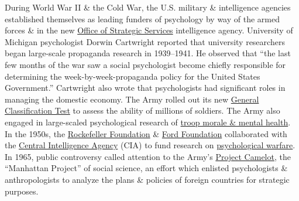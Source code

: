 \documentclass[oneside]{book}
\numberwithin{equation}{section}
\begin{document}
During World War II \& the Cold War, the U.S. military \& intelligence agencies established themselves as leading funders of psychology by way of the armed forces \& in the new \href{https://en.wikipedia.org/wiki/Office_of_Strategic_Services}{Office of Strategic Services} intelligence agency. University of Michigan psychologist Dorwin Cartwright reported that university researchers began large-scale propaganda research in 1939--1941. He observed that ``the last few months of the war saw a social psychologist become chiefly responsible for determining the week-by-week-propaganda policy for the United States Government.'' Cartwright also wrote that psychologists had significant roles in managing the domestic economy. The Army rolled out its new \href{https://en.wikipedia.org/wiki/Army_General_Classification_Test}{General Classification Test} to assess the ability of millions of soldiers. The Army also engaged in large-scaled psychological research of \href{https://en.wikipedia.org/wiki/Samuel_A._Stouffer#Studies_in_Social_Psychology_in_World_War_II:_The_American_Soldier}{troop morale \& mental health}. In the 1950s, the \href{https://en.wikipedia.org/wiki/Rockefeller_Foundation}{Rockefeller Foundation} \& \href{https://en.wikipedia.org/wiki/Ford_Foundation}{Ford Foundation} collaborated with the \href{https://en.wikipedia.org/wiki/Central_Intelligence_Agency}{Central Intelligence Agency} (CIA) to fund research on \href{https://en.wikipedia.org/wiki/Psychological_warfare}{psychological warfare}. In 1965, public controversy called attention to the Army's \href{https://en.wikipedia.org/wiki/Project_Camelot}{Project Camelot}, the ``Manhattan Project'' of social science, an effort which enlisted psychologists \& anthropologists to analyze the plans \& policies of foreign countries for strategic purposes.
\end{document}
